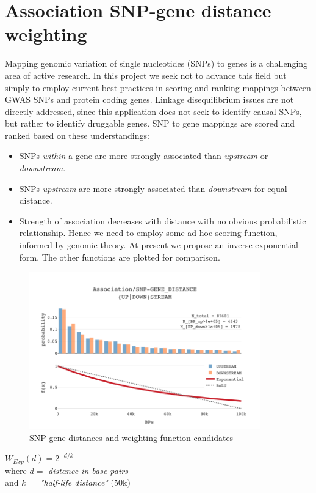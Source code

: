 \documentclass[12pt]{extarticle}
\begin{document}
\section{Association SNP-gene distance weighting}

Mapping genomic variation of single nucleotides (SNPs) to genes is a challenging area of active research. In this project we seek not to advance this field but simply to employ current best practices in scoring and ranking mappings between GWAS SNPs and protein coding genes. Linkage disequilibrium issues are not directly addressed, since this application does not seek to identify causal SNPs, but rather to identify druggable genes. SNP to gene mappings are scored and ranked based on these understandings:

\begin{itemize}
    \item SNPs \emph{within} a gene are more strongly associated than \emph{upstream} or \emph{downstream}.
    \item SNPs \emph{upstream} are more strongly associated than \emph{downstream} for equal distance.
    \item Strength of association decreases with distance with no obvious probabilistic relationship. Hence we need to employ some ad hoc scoring function, informed by genomic theory. At present we propose an inverse exponential form. The other functions are plotted for comparison.
\end{itemize}

\begin{figure}[h]
    \centering
    \includegraphics[width=10cm]{figures/assn_snp-gene-dist_func.png}
    \caption{SNP-gene distances and weighting function candidates}
    \label{fig:snp-gene-dist}
\end{figure}

\begin{center}
    $ W_{Exp}(d) = 2^{-d/k} $ \\
    where $ d = $ \emph{distance in base pairs} \\
    and $ k = $ \emph{"half-life distance"} (50k)
\end{center}
\end{document}
